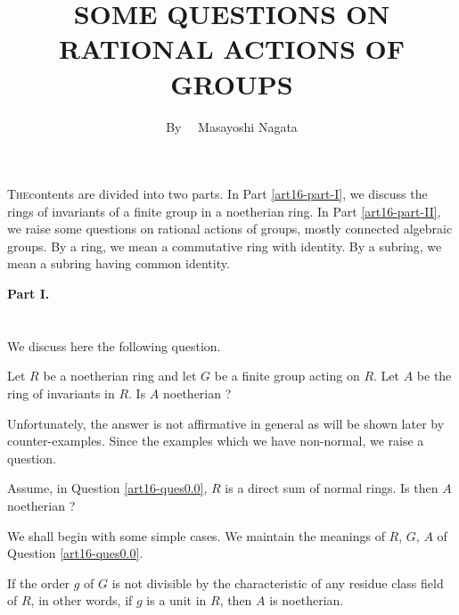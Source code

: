 \title{SOME QUESTIONS ON RATIONAL ACTIONS OF GROUPS}

\author{By~~ Masayoshi Nagata}
\date{}

\maketitle

\setcounter{pageoriginal}{322}
\textsc{The}\pageoriginale contents are divided into two parts. In Part \ref{art16-part-I}, we discuss the rings of invariants of a finite group in a noetherian ring. In Part \ref{art16-part-II}, we raise some questions on rational actions of groups, mostly connected algebraic groups. By a ring, we mean a commutative ring with identity. By a subring, we mean a subring having common identity.

\bigskip
\begin{center}
{\bf\Large Part I.}
\end{center}

\setcounter{section}{-1}
\section{} We discuss here the following question.

\setcounter{proposition}{-1}
\begin{question}\label{art16-ques0.0}
Let $R$ be a noetherian ring and let $G$ be a finite group acting on $R$. Let $A$ be the ring of invariants in $R$. Is $A$ noetherian ?
\end{question}

Unfortunately, the answer is not affirmative in general as will be shown later by counter-examples. Since the examples which we have non-normal, we raise a question.

\begin{question}\label{art16-ques0.1}
Assume, in Question \ref{art16-ques0.0}, $R$ is a direct sum of normal rings. Is then $A$ noetherian ?
\end{question}

We shall begin with some simple cases. We maintain the meanings of $R$, $G$, $A$ of Question \ref{art16-ques0.0}.

\begin{proposition}\label{art16-prop0.2}
If the order $g$ of $G$ is not divisible by the characteristic of any residue class field of $R$, in other words, if $g$ is a unit in $R$, then $A$ is noetherian.
\end{proposition}

